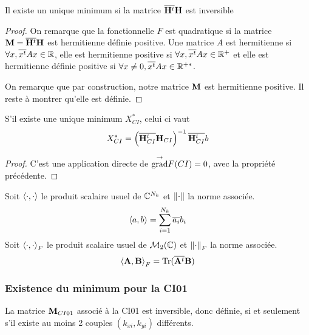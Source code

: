     \begin{prop}
      Il existe un unique minimum si la matrice \({\overline{\mathbf{H}^t}}{\mathbf{H}}\) est inversible
    \end{prop}

    \begin{proof}
      On remarque que la fonctionnelle \(F\) est quadratique si la matrice \(\mathbf{M}={\overline{\mathbf{H}^t}}{\mathbf{H}}\) est hermitienne définie positive. Une matrice \(A\) est hermitienne si \(\forall x, {\overline{x^t}}Ax \in \mathbb R\), elle est hermitienne positive si \(\forall x, {\overline{x^t}}Ax \in \mathbb R^+\) et elle est hermitienne définie positive si \(\forall x\not=0, {\overline{x^t}}Ax \in \mathbb R^{+*}\).

      On remarque que par construction, notre matrice \(\mathbf{M}\) est hermitienne positive. Il reste à montrer qu'elle est définie.
    \end{proof}

    \begin{prop}
      S'il existe une unique minimum \(X_{CI}^*\), celui ci vaut
      \[
        X_{CI}^* = \left({\overline{\mathbf{H}_{CI}^t}}{\mathbf{H}_{CI}}\right)^{-1}{\overline{\mathbf{H}_{CI}^t}}b
      \]
    \end{prop}

    \begin{proof}
      C'est une application directe de \({{\overset{\rightarrow}{\operatorname{grad}}}}{} F(CI) = 0 \), avec la propriété précédente.
    \end{proof}

    \begin{defn}
      Soit \(\left<{\cdot},{\cdot}\right>\) le produit scalaire usuel de \(\mathbb C^{N_{k}}\) et \(\left\lVert\cdot\right\rVert\) la norme associée.
      \begin{equation*}
        \left<{a},{b}\right> = \sum_{i=1}^{N_k} {\overline{a_i}} b_i
      \end{equation*}
      Soit \(\left<{\cdot},{\cdot}\right>_F\) le produit scalaire usuel de \(\mathcal{M}_2(\mathbb C)\) et \(\left\lVert\cdot\right\rVert_F\) la norme associée.
      \begin{equation*}
        \left<{\mathbf{A}},{\mathbf{B}}\right>_F = \operatorname{Tr}({\overline{\mathbf{A}^t}}\mathbf{B})
      \end{equation*}
    \end{defn}

    \subsubsection{Existence du minimum pour la CI01}

      \begin{prop}
        La matrice \({\mathbf{M}}_{CI01}\) associé à la CI01 est inversible, donc définie, si et seulement s'il existe au moins 2 couples \((k_{xi},k_{yi})\) différents.
      \end{prop}

